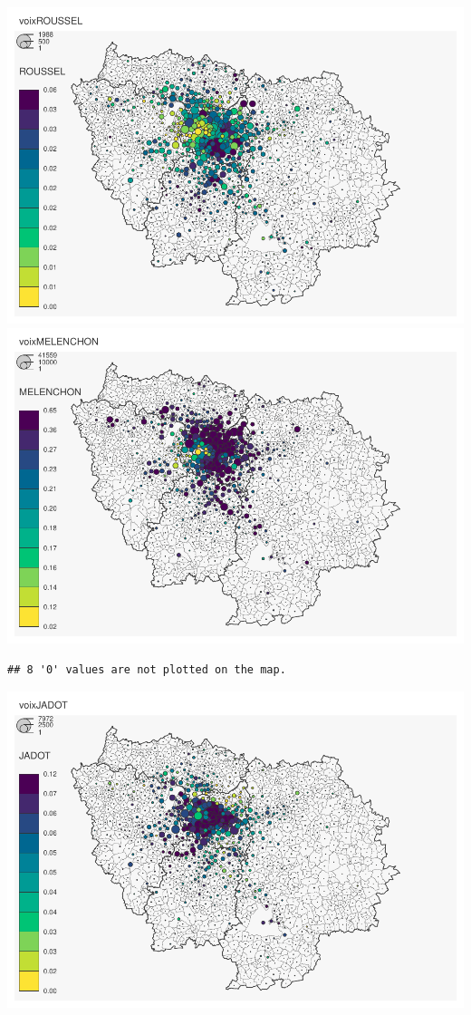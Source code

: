 \documentclass[
]{book}
\begin{document}
\includegraphics{manuel_geo_quanti_files/figure-latex/unnamed-chunk-52-3.pdf} \includegraphics{manuel_geo_quanti_files/figure-latex/unnamed-chunk-52-4.pdf}

\begin{verbatim}
## 8 '0' values are not plotted on the map.
\end{verbatim}

\includegraphics{manuel_geo_quanti_files/figure-latex/unnamed-chunk-52-5.pdf}
\end{document}
